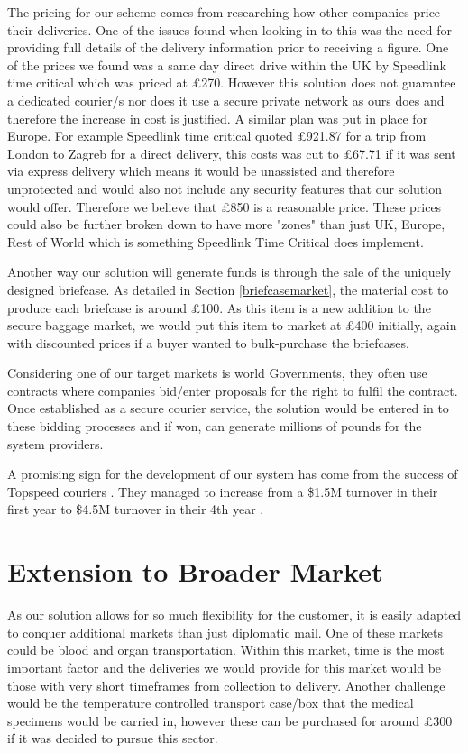 The pricing for our scheme comes from researching how other companies price their deliveries. One of the issues found when looking in to this was the need for providing full details of the delivery information prior to receiving a figure. One of the prices we found was a same day direct drive within the UK by Speedlink time critical which was priced at £270. However this solution does not guarantee a dedicated courier/s nor does it use a secure private network as ours does and therefore the increase in cost is justified. A similar plan was put in place for Europe. For example Speedlink time critical quoted £921.87 for a trip from London to Zagreb for a direct delivery, this costs was cut to £67.71 if it was sent via express delivery which means it would be unassisted and therefore unprotected and would also not include any security features that our solution would offer. Therefore we believe that £850 is a reasonable price. These prices could also be further broken down to have more "zones" than just UK, Europe, Rest of World which is something Speedlink Time Critical does implement. 

Another way our solution will generate funds is through the sale of the uniquely designed briefcase. As detailed in Section \ref{briefcasemarket}, the material cost to produce each briefcase is around £100. As this item is a new addition to the secure baggage market, we would put this item to market at £400 initially, again with discounted prices if a buyer wanted to bulk-purchase the briefcases. 

Considering one of our target markets is world Governments, they often use contracts where companies bid/enter proposals for the right to fulfil the contract. Once established as a secure courier service, the solution would be entered in to these bidding processes and if won, can generate millions of pounds for the system providers. 

A promising sign for the development of our system has come from the success of Topspeed couriers \cite{topspeed}. They managed to increase from a \$1.5M turnover in their first year to \$4.5M turnover in their 4th year \cite{smesVideo}.

\section{Extension to Broader Market}
As our solution allows for so much flexibility for the customer, it is easily adapted to conquer additional markets than just diplomatic mail. One of these markets could be blood and organ transportation. Within this market, time is the most important factor and the deliveries we would provide for this market would be those with very short timeframes from collection to delivery. Another challenge would be the temperature controlled transport case/box that the medical specimens would be carried in, however these can be purchased for around £300 \cite{courierCoolers} if it was decided to pursue this sector. 

